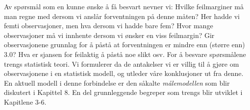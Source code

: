 Av spørsmål som en kunne ønske å få besvart nevner vi: 
Hvilke feil\-mar\-giner  må man regne med dersom vi anslår forventningen
på denne måten?  Her hadde vi femti observasjoner, men hva dersom vi
hadde bare fem?  Hvor mange observasjoner må vi innhente dersom
vi ønsker en viss feilmargin?  Gir observasjonene grunnlag for å
påstå at forventningen er mindre enn (større enn) 3.0?  Hva er
sjansen for feilaktig å påstå noe slikt osv.  For å besvare
spørsmålene trengs statistisk teori.  Vi formulerer da de
antakelser vi er villig til å gjøre om observasjonene i en
statistisk mo\-dell, og utleder våre konklusjoner ut fra denne.  En
aktuell modell i denne forbindelse er den såkalte {\em målemodellen}
som blir diskutert i Kapittel 8.  En del grunnleggende begreper
som trengs blir utviklet i Kapitlene 3-6.\\
                                     
